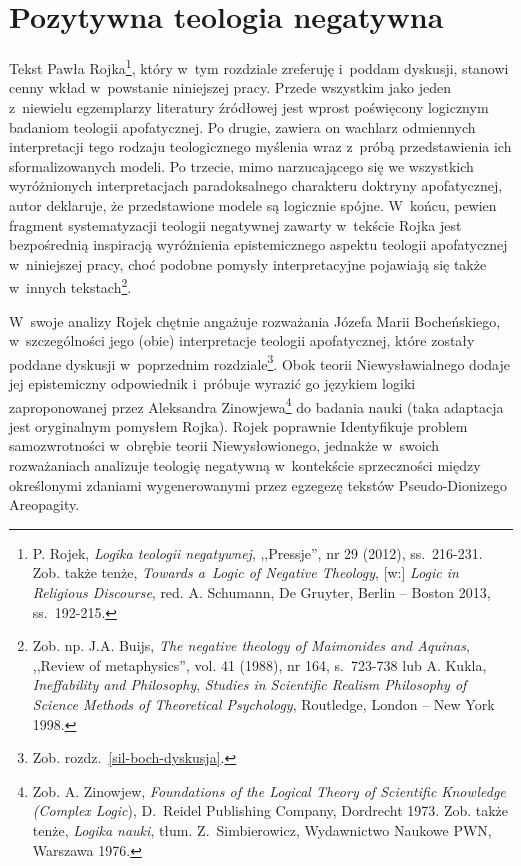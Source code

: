 \chapter{Pozytywna teologia negatywna}\label{sil-pozytywna}






Tekst Pawła Rojka\footnote{ P. Rojek, \textit{Logika teologii negatywnej}, ,,Pressje'', nr 29 (2012), ss.~216-231. Zob. także tenże, \textit{Towards a~Logic of Negative Theology}, [w:] \textit{Logic in Religious Discourse}, red. A. Schumann, De Gruyter, Berlin -- Boston 2013, ss.~192-215.}, który w~tym rozdziale zreferuję i~poddam dyskusji, stanowi cenny wkład w~powstanie niniejszej pracy. Przede wszystkim jako jeden z~niewielu egzemplarzy literatury źródłowej jest wprost poświęcony logicznym badaniom teologii apofatycznej. Po drugie, zawiera on wachlarz odmiennych interpretacji tego rodzaju teologicznego myślenia wraz z~próbą przedstawienia ich sformalizowanych modeli. Po trzecie, mimo narzucającego się we wszystkich wyróżnionych interpretacjach paradoksalnego charakteru doktryny apofatycznej, autor deklaruje, że przedstawione modele są logicznie spójne. W~końcu, pewien fragment systematyzacji teologii negatywnej zawarty w~tekście Rojka jest bezpośrednią inspiracją wyróżnienia epistemicznego aspektu teologii apofatycznej w~niniejszej pracy, choć podobne pomysły interpretacyjne pojawiają się także w~innych tekstach\footnote{ Zob. np. J.A. Buijs, \textit{The negative theology of Maimonides and Aquinas}, ,,Review of metaphysics'', vol. 41 (1988), nr 164, s.~723-738 lub A. Kukla, \textit{Ineffability and Philosophy}, \textit{Studies in Scientific Realism Philosophy of Science Methods of Theoretical Psychology}, Routledge, London -- New York 1998.}.

W~swoje analizy Rojek chętnie angażuje rozważania Józefa Marii Bocheńskiego, w~szczególności jego (obie) interpretacje teologii apofatycznej, które zostały poddane dyskusji w~poprzednim rozdziale\footnote{ Zob. rozdz.~\ref{sil-boch-dyskusja}.}. Obok teorii Niewysławialnego dodaje jej epistemiczny odpowiednik i~próbuje wyrazić go językiem logiki zaproponowanej przez Aleksandra Zinowjewa\footnote{ Zob. A. Zinowjew, \textit{Foundations of the Logical Theory of Scientific Knowledge (Complex Logic}), D.~Reidel Publishing Company, Dordrecht 1973. Zob. także tenże, \textit{Logika nauki}, tłum. Z.~Simbierowicz, Wydawnictwo Naukowe PWN, Warszawa 1976.} do badania nauki (taka adaptacja jest oryginalnym pomysłem Rojka). Rojek poprawnie Identyfikuje problem samozwrotności w~obrębie teorii Niewysłowionego, jednakże w~swoich rozważaniach analizuje teologię negatywną w~kontekście sprzeczności między określonymi zdaniami wygenerowanymi przez egzegezę tekstów Pseudo-Dionizego Areopagity.

